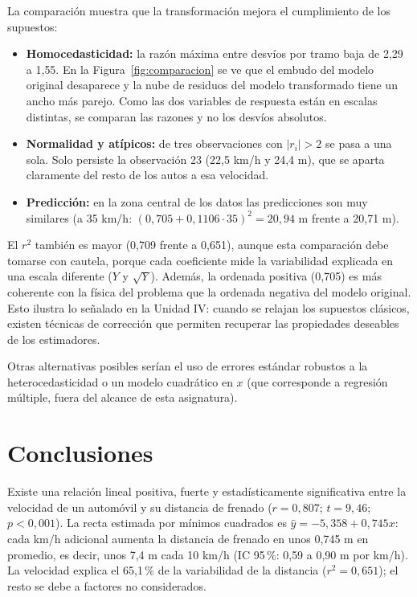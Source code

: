\documentclass[12pt,a4paper]{article}
\begin{document}
La comparación muestra que la transformación mejora el cumplimiento de los supuestos:
\begin{itemize}[leftmargin=*]
  \item \textbf{Homocedasticidad:} la razón máxima entre desvíos por tramo baja de 2{,}29 a 1{,}55. En la Figura~\ref{fig:comparacion} se ve que el embudo del modelo original desaparece y la nube de residuos del modelo transformado tiene un ancho más parejo. Como las dos variables de respuesta están en escalas distintas, se comparan las razones y no los desvíos absolutos.
  \item \textbf{Normalidad y atípicos:} de tres observaciones con $|r_i| > 2$ se pasa a una sola. Solo persiste la observación 23 (22{,}5 km/h y 24{,}4 m), que se aparta claramente del resto de los autos a esa velocidad.
  \item \textbf{Predicción:} en la zona central de los datos las predicciones son muy similares (a 35 km/h: $(0{,}705 + 0{,}1106 \cdot 35)^2 = 20{,}94$ m frente a 20{,}71 m).
\end{itemize}

El $r^2$ también es mayor (0{,}709 frente a 0{,}651), aunque esta comparación debe tomarse con cautela, porque cada coeficiente mide la variabilidad explicada en una escala diferente ($Y$ y $\sqrt{Y}$). Además, la ordenada positiva (0{,}705) es más coherente con la física del problema que la ordenada negativa del modelo original. Esto ilustra lo señalado en la Unidad IV: cuando se relajan los supuestos clásicos, existen técnicas de corrección que permiten recuperar las propiedades deseables de los estimadores.

Otras alternativas posibles serían el uso de errores estándar robustos a la heterocedasticidad o un modelo cuadrático en $x$ (que corresponde a regresión múltiple, fuera del alcance de esta asignatura).

\section{Conclusiones}

Existe una relación lineal positiva, fuerte y estadísticamente significativa entre la velocidad de un automóvil y su distancia de frenado ($r = 0{,}807$; $t = 9{,}46$; $p < 0{,}001$). La recta estimada por mínimos cuadrados es $\hat{y} = -5{,}358 + 0{,}745x$: cada km/h adicional aumenta la distancia de frenado en unos 0{,}745 m en promedio, es decir, unos 7{,}4 m cada 10 km/h (IC 95\,\%: 0{,}59 a 0{,}90 m por km/h). La velocidad explica el 65{,}1\,\% de la variabilidad de la distancia ($r^2 = 0{,}651$); el resto se debe a factores no considerados.
 
\end{document}
